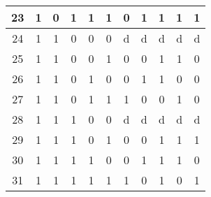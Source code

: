 \documentclass{article}
\begin{document}
\begin{center}
\begin{tabular}{|c|ccc|cc|ccccc|}
    23 & 1 & 0 & 1 & 1 & 1 & 0 & 1 & 1 & 1 & 1 \\ \hline
    24 & 1 & 1 & 0 & 0 & 0 & d & d & d & d & d \\ \hline
    25 & 1 & 1 & 0 & 0 & 1 & 0 & 0 & 1 & 1 & 0 \\ \hline
    26 & 1 & 1 & 0 & 1 & 0 & 0 & 1 & 1 & 0 & 0 \\ \hline
    27 & 1 & 1 & 0 & 1 & 1 & 1 & 0 & 0 & 1 & 0 \\ \hline
    28 & 1 & 1 & 1 & 0 & 0 & d & d & d & d & d \\ \hline
    29 & 1 & 1 & 1 & 0 & 1 & 0 & 0 & 1 & 1 & 1 \\ \hline
    30 & 1 & 1 & 1 & 1 & 0 & 0 & 1 & 1 & 1 & 0 \\ \hline
    31 & 1 & 1 & 1 & 1 & 1 & 1 & 0 & 1 & 0 & 1 \\ \hline
\end{tabular}\end{center}
\end{document}
